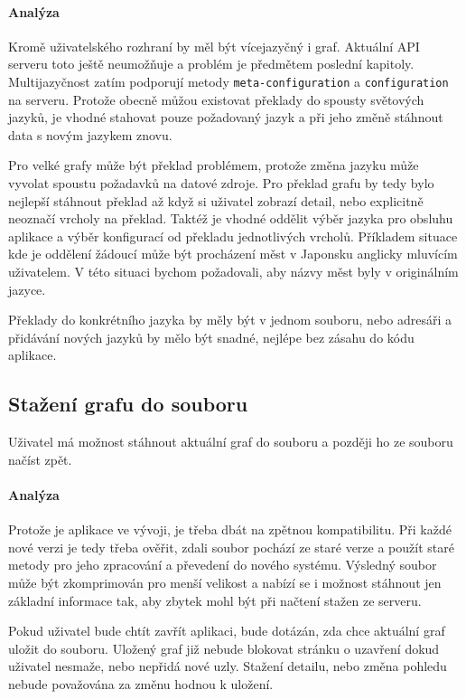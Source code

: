 \paragraph{Analýza} Kromě uživatelského rozhraní by měl být vícejazyčný i graf. Aktuální API serveru toto ještě neumožňuje a problém je předmětem poslední kapitoly. Multijazyčnost zatím podporují metody \texttt{meta-configuration} a \texttt{configuration} na serveru. Protože obecně můžou existovat překlady do spousty světových jazyků, je vhodné stahovat pouze požadovaný jazyk a při jeho změně stáhnout data s novým jazykem znovu.

Pro velké grafy může být překlad problémem, protože změna jazyku může vyvolat spoustu požadavků na datové zdroje. Pro překlad grafu by tedy bylo nejlepší stáhnout překlad až když si uživatel zobrazí detail, nebo explicitně neoznačí vrcholy na překlad. Taktéž je vhodné oddělit výběr jazyka pro obsluhu aplikace a výběr konfigurací od překladu jednotlivých vrcholů. Příkladem situace kde je oddělení žádoucí může být procházení měst v Japonsku anglicky mluvícím uživatelem. V této situaci bychom požadovali, aby názvy měst byly v originálním jazyce.

Překlady do konkrétního jazyka by měly být v jednom souboru, nebo adresáři a přidávání nových jazyků by mělo být snadné, nejlépe bez zásahu do kódu aplikace.

\subsection*{Stažení grafu do souboru}
Uživatel má možnost stáhnout aktuální graf do souboru a později ho ze souboru načíst zpět.

\paragraph{Analýza} Protože je aplikace ve vývoji, je třeba dbát na zpětnou kompatibilitu. Při každé nové verzi je tedy třeba ověřit, zdali soubor pochází ze staré verze a použít staré metody pro jeho zpracování a převedení do nového systému. Výsledný soubor může být zkomprimován pro menší velikost a nabízí se i možnost stáhnout jen základní informace tak, aby zbytek mohl být při načtení stažen ze serveru.

Pokud uživatel bude chtít zavřít aplikaci, bude dotázán, zda chce aktuální graf uložit do souboru. Uložený graf již nebude blokovat stránku o uzavření dokud uživatel nesmaže, nebo nepřidá nové uzly. Stažení detailu, nebo změna pohledu nebude považována za změnu hodnou k uložení.

